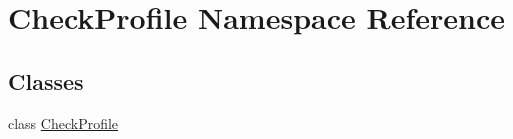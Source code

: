 \hypertarget{namespaceCheckProfile}{\section{Check\-Profile Namespace Reference}
\label{namespaceCheckProfile}
}
\subsection*{Classes}
\begin{DoxyCompactItemize}
\item 
class \hyperlink{classCheckProfile_1_1CheckProfile}{Check\-Profile}
\end{DoxyCompactItemize}
